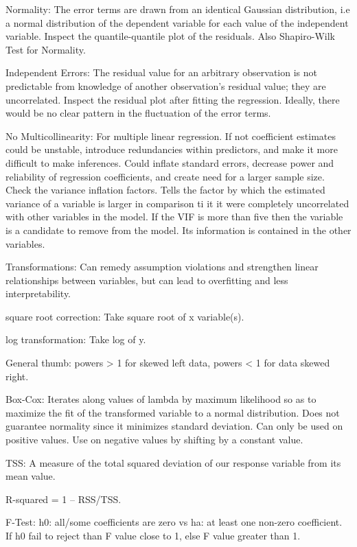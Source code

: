 \documentclass[]{book}
\theoremstyle{definition}
\theoremstyle{definition}
\theoremstyle{definition}
\theoremstyle{remark}
\begin{document}
Normality: The error terms are drawn from an identical Gaussian
distribution, i.e a normal distribution of the dependent variable for
each value of the independent variable. Inspect the quantile-quantile
plot of the residuals. Also Shapiro-Wilk Test for Normality.

Independent Errors: The residual value for an arbitrary observation is
not predictable from knowledge of another observation's residual value;
they are uncorrelated. Inspect the residual plot after fitting the
regression. Ideally, there would be no clear pattern in the fluctuation
of the error terms.

No Multicollinearity: For multiple linear regression. If not coefficient
estimates could be unstable, introduce redundancies within predictors,
and make it more difficult to make inferences. Could inflate standard
errors, decrease power and reliability of regression coefficients, and
create need for a larger sample size. Check the variance inflation
factors. Tells the factor by which the estimated variance of a variable
is larger in comparison ti it it were completely uncorrelated with other
variables in the model. If the VIF is more than five then the variable
is a candidate to remove from the model. Its information is contained in
the other variables.

Transformations: Can remedy assumption violations and strengthen linear
relationships between variables, but can lead to overfitting and less
interpretability.

square root correction: Take square root of x variable(s).

log transformation: Take log of y.

General thumb: powers \textgreater{} 1 for skewed left data, powers
\textless{} 1 for data skewed right.

Box-Cox: Iterates along values of lambda by maximum likelihood so as to
maximize the fit of the transformed variable to a normal distribution.
Does not guarantee normality since it minimizes standard deviation. Can
only be used on positive values. Use on negative values by shifting by a
constant value.

TSS: A measure of the total squared deviation of our response variable
from its mean value.

R-squared = 1 -- RSS/TSS.

F-Test: h0: all/some coefficients are zero vs ha: at least one non-zero
coefficient. If h0 fail to reject than F value close to 1, else F value
greater than 1.
\end{document}
